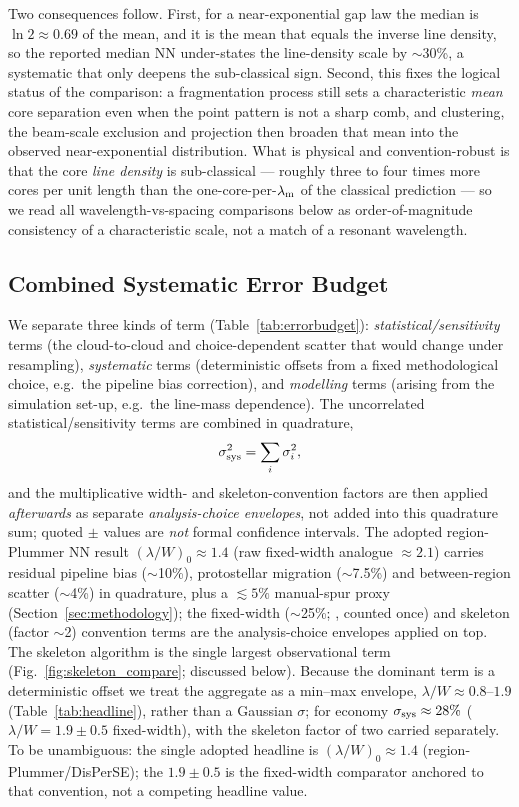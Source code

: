 \documentclass[usenatbib,twoside,twocolumn]{mnras}
\begin{document}
Two consequences follow. First, for a near-exponential gap law the median is $\ln2\approx0.69$ of the mean, and it is the mean that equals the inverse line density, so the reported median NN under-states the line-density scale by $\sim$30\%, a systematic that only deepens the sub-classical sign. Second, this fixes the logical status of the comparison: a fragmentation process still sets a characteristic \emph{mean} core separation even when the point pattern is not a sharp comb, and clustering, the beam-scale exclusion and projection then broaden that mean into the observed near-exponential distribution. What is physical and convention-robust is that the core \emph{line density} is sub-classical --- roughly three to four times more cores per unit length than the one-core-per-$\lambda_{\rm m}$ of the classical prediction --- so we read all wavelength-vs-spacing comparisons below as order-of-magnitude consistency of a characteristic scale, not a match of a resonant wavelength.

\subsection{Combined Systematic Error Budget}
\label{sec:error_budget}

We separate three kinds of term (Table~\ref{tab:errorbudget}): \emph{statistical/sensitivity} terms (the cloud-to-cloud and choice-dependent scatter that would change under resampling), \emph{systematic} terms (deterministic offsets from a fixed methodological choice, e.g.\ the pipeline bias correction), and \emph{modelling} terms (arising from the simulation set-up, e.g.\ the line-mass dependence). The uncorrelated statistical/sensitivity terms are combined in quadrature,
\begin{equation}
\sigma_{\rm sys}^2=\sum_i\sigma_i^2,
\label{eq:quadrature}
\end{equation}
and the multiplicative width- and skeleton-convention factors are then applied \emph{afterwards} as separate \emph{analysis-choice envelopes}, not added into this quadrature sum; quoted $\pm$ values are \emph{not} formal confidence intervals. The adopted region-Plummer NN result $(\lambda/W)_0\approx1.4$ (raw fixed-width analogue $\approx2.1$) carries residual pipeline bias ($\sim$10\%), protostellar migration ($\sim$7.5\%) and between-region scatter ($\sim$4\%) in quadrature, plus a $\lesssim5\%$ manual-spur proxy (Section~\ref{sec:methodology}); the fixed-width ($\sim$25\%; \citealt{Panopoulou2022}, counted once) and skeleton (factor $\sim$2) convention terms are the analysis-choice envelopes applied on top. The skeleton algorithm is the single largest observational term (Fig.~\ref{fig:skeleton_compare}; discussed below). Because the dominant term is a deterministic offset we treat the aggregate as a min--max envelope, $\lambda/W\approx0.8$--$1.9$ (Table~\ref{tab:headline}), rather than a Gaussian $\sigma$; for economy $\sigma_{\rm sys}\approx28\%$ ($\lambda/W=1.9\pm0.5$ fixed-width), with the skeleton factor of two carried separately. To be unambiguous: the single adopted headline is $(\lambda/W)_0\approx1.4$ (region-Plummer/DisPerSE); the $1.9\pm0.5$ is the fixed-width comparator anchored to that convention, not a competing headline value.
\end{document}
